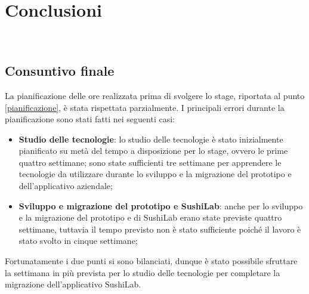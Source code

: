 \chapter{Conclusioni}
\label{conclusioni}
\\
\section{Consuntivo finale}
La pianificazione delle ore realizzata prima di svolgere lo stage, riportata al punto \ref{pianificazione}, è stata rispettata parzialmente. I principali errori durante la pianificazione sono stati fatti nei seguenti casi:
\begin{itemize}
  \item \textbf{Studio delle tecnologie}: lo studio delle tecnologie è stato inizialmente pianificato su metà del tempo a disposizione per lo stage, ovvero le prime quattro settimane; sono state sufficienti tre settimane per apprendere le tecnologie da utilizzare durante lo sviluppo e la migrazione del prototipo e dell'applicativo aziendale;
  \item \textbf{Sviluppo e migrazione del prototipo e SushiLab}: anche per lo sviluppo e la migrazione del prototipo e di SushiLab erano state previste quattro settimane, tuttavia il tempo previsto non è stato sufficiente poiché il lavoro è stato svolto in cinque settimane;
\end{itemize}
Fortunatamente i due punti si sono bilanciati, dunque è stato possibile sfruttare la settimana in più prevista per lo studio delle tecnologie per completare la migrazione dell'applicativo SushiLab.
